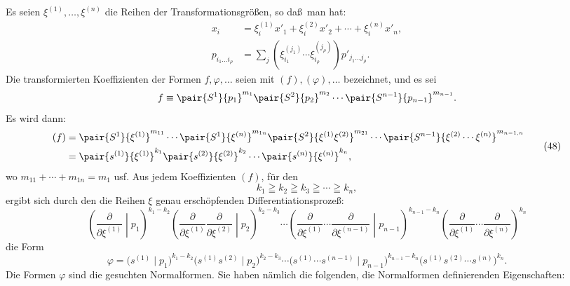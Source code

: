 Es seien $\xi^{(1)},\ldots,\xi^{(n)}$ die Reihen der Transformationsgr\"o\ss en, so da\ss\ man hat:
\begin{equation}
\begin{aligned}
x_i&=\xi_i^{(1)}x'_1+\xi_i^{(2)}x'_2+\cdots+\xi_i^{(n)}x'_n,\\
p_{i_1\ldots i_\rho}&=\sum_j(\xi_{i_1}^{(j_1)}\cdots \xi_{i_\rho}^{(j_\rho)})p'_{j_1\ldots j_\rho}.
\end{aligned}
\tag{47}
\end{equation}
Die transformierten Koeffizienten der Formen $f,\varphi,\ldots$ seien mit $(f),(\varphi),\ldots$ bezeichnet, und es sei
\[
 f\equiv\pair{S^1}{p_1}^{m_1}\pair{S^2}{p_2}^{m_2}\cdots\pair{S^{n-1}}{p_{n-1}}^{m_{n-1}}.
\]
Es wird dann:
\begin{equation}
\begin{aligned}
(f)&=\pair{S^1}{\xi^{(1)}}^{m_{11}}\cdots\pair{S^1}{\xi^{(n)}}^{m_{1n}}
\pair{S^2}{\xi^{(1)}\xi^{(2)}}^{m_{21}}\cdots
\pair{S^{n-1}}{\xi^{(2)}\cdots\xi^{(n)}}^{m_{n-1,n}}\\
&=\pair{s^{(1)}}{\xi^{(1)}}^{k_1}\pair{s^{(2)}}{\xi^{(2)}}^{k_2}\cdots\pair{s^{(n)}}{\xi^{(n)}}^{k_n},
\end{aligned}
\tag{48}
\end{equation}
wo $m_{11}+\cdots+m_{1n}=m_1$ usf. Aus jedem Koeffizienten $(f)$, f\"ur den
\begin{equation}
 k_1\geqq k_2\geqq k_3\geqq\cdots\geqq k_n,
\tag{49}
\end{equation}
ergibt sich durch den die Reihen $\xi$ genau ersch\"opfenden Differentiationsproze\ss:
\begin{equation}
\left(\frac{\partial}{\partial\xi^{(1)}}\middle|p_1\right)^{k_1-k_2}
\left(\frac{\partial}{\partial\xi^{(1)}}\frac{\partial}{\partial\xi^{(2)}}\middle|p_2\right)^{k_2-k_3}
\cdots
\left(\frac{\partial}{\partial\xi^{(1)}}\cdots\frac{\partial}{\partial\xi^{(n-1)}}\middle|p_{n-1}\right)^{k_{n-1}-k_n}
\left(\frac{\partial}{\partial\xi^{(1)}}\cdots\frac{\partial}{\partial\xi^{(n)}}\right)^{k_n}
\tag{50}
\end{equation}
die Form
\begin{equation}
 \varphi=\bigl(s^{(1)}\mid p_1\bigr)^{k_1-k_2}
 \bigl(s^{(1)}s^{(2)}\mid p_2\bigr)^{k_2-k_3}\cdots
 \bigl(s^{(1)}\cdots s^{(n-1)}\mid p_{n-1}\bigr)^{k_{n-1}-k_n}
 \bigl(s^{(1)}s^{(2)}\cdots s^{(n)}\bigr)^{k_n}.
\tag{51}
\end{equation}
Die Formen $\varphi$ sind die gesuchten Normalformen. Sie haben n\"amlich die folgenden, die Normalformen definierenden Eigenschaften:
